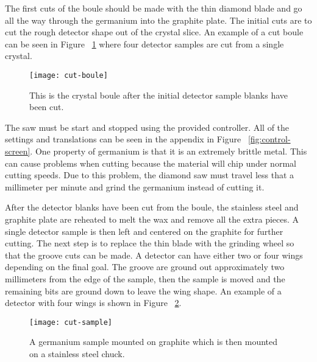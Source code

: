 The first cuts of the boule should be made with the thin diamond blade and go all the way through the germanium into the graphite plate.
The initial cuts are to cut the rough detector shape out of the crystal slice.
An example of a cut boule can be seen in Figure ~\ref{fig:cutboule} where four detector samples are cut from a single crystal.
\begin{figure}[htpb]
\centering
\texttt{[image: cut-boule]}
\caption{This is the crystal boule after the initial detector sample blanks have been cut.}
\label{fig:cutboule}
\end{figure}
The saw must be start and stopped using the provided controller.
All of the settings and translations can be seen in the appendix in Figure ~\ref{fig:control-screen}.
One property of germanium is that it is an extremely brittle metal.
This can cause problems when cutting because the material will chip under normal cutting speeds.
Due to this problem, the diamond saw must travel less that a millimeter per minute and grind the germanium instead of cutting it.

After the detector blanks have been cut from the boule, the stainless steel and graphite plate are reheated to melt the wax and remove all the extra pieces.
A single detector sample is then left and centered on the graphite for further cutting.
The next step is to replace the thin blade with the grinding wheel so that the groove cuts can be made.
A detector can have either two or four wings depending on the final goal.
The groove are ground out approximately two millimeters from the edge of the sample, then the sample is moved and the remaining bits are ground down to leave the wing shape.
An example of a detector with four wings is shown in Figure ~\ref{fig:cut-sample}.
\begin{figure}[htpb]
\centering
\texttt{[image: cut-sample]}
\caption{A germanium sample mounted on graphite which is then mounted on a stainless steel chuck.}
\label{fig:cut-sample}
\end{figure}

